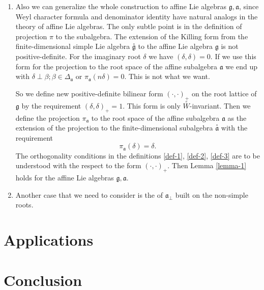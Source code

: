 \documentclass[12pt]{article}
\theoremstyle{definition}
\newcommand{\co}[1]{\stackrel{\circ }{#1}}
\newcommand{\gf}{\mathfrak{g}}
\newcommand{\af}{\mathfrak{a}}
\newcommand{\afb}{\mathfrak{a}_{\bot}}
\begin{document}
\begin{enumerate}
\item Also we can generalize the whole construction to affine Lie algebras $\gf, \af$, since Weyl character formula and denominator identity have natural analogs in the theory of affine Lie algebras. The only subtle point is in the definition of projection $\pi$ to the subalgebra. The extension of the Killing form from the finite-dimensional simple Lie algebra $\co{\gf}$ to the affine Lie algebra $\gf$ is not positive-definite. For the imaginary root $\delta$ we have $(\delta,\delta)=0$. If we use this form for the projection to the root space of the affine subalgebra $\af$ we end up with $\delta\perp \beta; \beta\in \Delta_{\af}$ or $\pi_{\af}(n\delta)=0$. This is not what we want. 

So we define new positive-definite bilinear form $(\cdot,\cdot)_+$ on the root lattice of $\gf$ by the requirement $(\delta,\delta)_+=1$. This form is only $\co{W}$-invariant. Then we define the projection $\pi_{\af}$ to the root space of the affine subalgebra $\af$ as the extension of the projection to the finite-dimensional subalgebra $\co{\af}$ with the requirement
\begin{equation}
  \label{eq:16}
  \pi_{\af}(\delta)=\delta.
\end{equation}
The orthogonality conditions in the definitions \ref{def-1}, \ref{def-2}, \ref{def-3} are to be understood with the respect to the form $(\cdot,\cdot)_+$. Then Lemma \ref{lemma-1} holds for the affine Lie algebras $\gf, \af$.
\item Another case that we need to consider is the of $\afb$ built on the non-simple roots.
\end{enumerate}

\section{Applications}
\label{sec:applications}

\section{Conclusion}
\label{sec:conclusion}



{}

\end{document}
